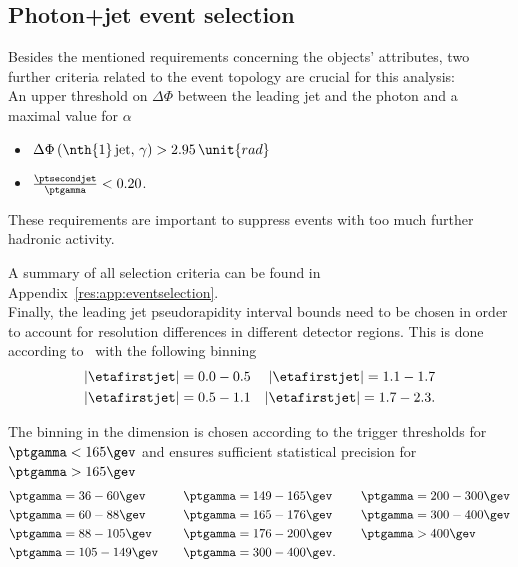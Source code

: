 \subsection{Photon+jet event selection}
Besides the mentioned requirements concerning the objects' attributes, two further criteria related to the event topology are crucial for this analysis:\\
An upper threshold on $\Delta \Phi$ between the leading jet and the photon and a maximal value for $\alpha$
\begin{itemize}
 \item $\Delta \Phi \left(\text{\nth{1}\,jet},\,\gamma \right) > 2.95\,\unit{rad}$
 \item $\frac{\ptsecondjet}{\ptgamma} < 0.20$.
\end{itemize}
These requirements are important to suppress events with too much further hadronic activity.

A summary of all selection criteria can be found in Appendix~\ref{res:app:eventselection}.\\

Finally, the leading jet pseudorapidity interval bounds need to be chosen in order to account for resolution differences in different detector regions.
This is done according to~\cite{bib:Matthias_Thesis} with the following binning
\begin{align*}
|\etafirstjet| = 0.0-0.5 && |\etafirstjet| = 1.1-1.7 \\
|\etafirstjet| = 0.5-1.1 && |\etafirstjet| = 1.7-2.3.
\end{align*}

The binning in the \ptgamma dimension is chosen according to the trigger thresholds for \mbox{$\ptgamma<165\gev$} and ensures sufficient statistical precision for \mbox{$\ptgamma>165\gev$}
\begin{align*}
\ptgamma &= 36 -60\gev     &  \ptgamma &= 149-165\gev   & \ptgamma &= 200-300\gev\\
\ptgamma &= 60 -88\gev     &  \ptgamma &= 165-176\gev  & \ptgamma &= 300-400\gev\\
\ptgamma &= 88 -105\gev    &  \ptgamma &= 176-200\gev  & \ptgamma &> 400\gev\\
\ptgamma &= 105-149\gev   \quad &  \ptgamma  &= 300-400\gev. \quad& \\
\end{align*}



